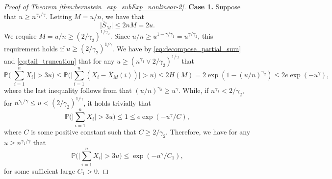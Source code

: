 \documentclass[11pt]{article}
\theoremstyle{plain}
\theoremstyle{definition}
\begin{document}
\begin{proof}[Proof of Theorem \ref{thm:bernstein_exp_subExp_nonlinear-2}]
\textbf{Case 1.} Suppose that $u \geq n^{\gamma_1/\gamma}$. Letting $M = u/n$, we have that
\begin{equation*}
    \big|\overline{S}_M\big| \leq 2nM = 2u.
\end{equation*}
We require $M = u/n \geq (2/\gamma_2)^{1/\gamma_2}$. Since $u/n \geq u^{1-\gamma/\gamma_1} = u^{\gamma/\gamma_2}$, this requirement holds if $u \geq (2/\gamma_2)^{1/\gamma}$.
We have by \eqref{eq:decompose_partial_sum} and \eqref{eq:tail_truncation} that for any $u \geq (n^{\gamma_1} \vee 2/\gamma_2)^{1/\gamma}$ that
\[    
    \mathbb{P}\Big( \Big|\sum_{i = 1}^nX_i\Big| > 3u \Big) \leq \mathbb{P}\Big( \Big|\sum_{i = 1}^n(X_i - \overline{X}_M(i))\Big| > u \Big) \leq 2H(M) =  2\exp(1-(u/n)^{\gamma_2}) \leq 2e\exp(-u^{\gamma}),
\]
where the last inequality follows from that $(u/n)^{\gamma_2} \geq u^{\gamma}$. While, if $n^{\gamma_1} < 2/\gamma_2$, for $n^{\gamma_1/\gamma} \leq u < (2/\gamma_2)^{1/\gamma}$, it holds trivially that
\begin{equation*}
    \mathbb{P}\Big( \Big|\sum_{i = 1}^nX_i\Big| > 3u \Big) \leq 1 \leq e\exp(-u^{\gamma}/C),
\end{equation*}
where $C$ is some positive constant such that $C \geq 2/\gamma_2$. Therefore, we have for any $u \geq n^{\gamma_1/\gamma}$ that
\begin{equation*}
    \mathbb{P}\Big( \Big|\sum_{i = 1}^nX_i\Big| > 3u \Big) \leq \exp(-u^{\gamma}/C_1),
\end{equation*}
for some sufficient large $C_1 > 0$.


\end{proof}
\end{document}
